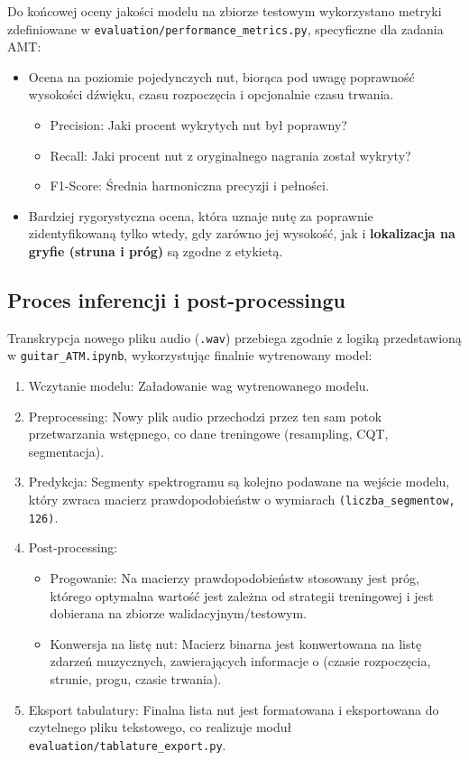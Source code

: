 Do końcowej oceny jakości modelu na zbiorze testowym wykorzystano metryki zdefiniowane w \texttt{evaluation/performance\_metrics.py}, specyficzne dla zadania AMT:
\begin{itemize}
    \item {} Ocena na poziomie pojedynczych nut, biorąca pod uwagę poprawność wysokości dźwięku, czasu rozpoczęcia i opcjonalnie czasu trwania.
    \begin{itemize}
        \item Precision: Jaki procent wykrytych nut był poprawny?
        \item Recall: Jaki procent nut z oryginalnego nagrania został wykryty?
        \item F1-Score: Średnia harmoniczna precyzji i pełności.
    \end{itemize}
    \item {} Bardziej rygorystyczna ocena, która uznaje nutę za poprawnie zidentyfikowaną tylko wtedy, gdy zarówno jej wysokość, jak i \textbf{lokalizacja na gryfie (struna i próg)} są zgodne z etykietą.
\end{itemize}

\subsection*{Proces inferencji i post-processingu}

Transkrypcja nowego pliku audio (\texttt{.wav}) przebiega zgodnie z logiką przedstawioną w \texttt{guitar\_ATM.ipynb}, wykorzystując finalnie wytrenowany model:
\begin{enumerate}
    \item Wczytanie modelu: Załadowanie wag wytrenowanego modelu.
    \item Preprocessing: Nowy plik audio przechodzi przez ten sam potok przetwarzania wstępnego, co dane treningowe (resampling, CQT, segmentacja).
    \item Predykcja: Segmenty spektrogramu są kolejno podawane na wejście modelu, który zwraca macierz prawdopodobieństw o wymiarach \texttt{(liczba\_segmentow, 126)}.
    \item Post-processing:
    \begin{itemize}
        \item Progowanie: Na macierzy prawdopodobieństw stosowany jest próg, którego optymalna wartość jest zależna od strategii treningowej i jest dobierana na zbiorze walidacyjnym/testowym.
        \item Konwersja na listę nut: Macierz binarna jest konwertowana na listę zdarzeń muzycznych, zawierających informacje o (czasie rozpoczęcia, strunie, progu, czasie trwania).
    \end{itemize}
    \item Eksport tabulatury: Finalna lista nut jest formatowana i eksportowana do czytelnego pliku tekstowego, co realizuje moduł \texttt{evaluation/tablature\_export.py}.
\end{enumerate}

